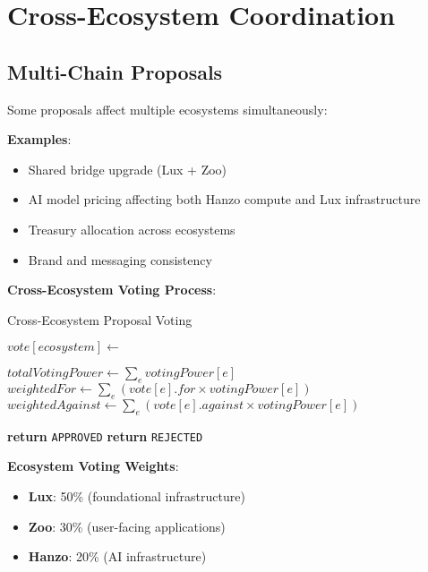 \documentclass[11pt,a4paper]{article}
\begin{document}
\section{Cross-Ecosystem Coordination}

\subsection{Multi-Chain Proposals}

Some proposals affect multiple ecosystems simultaneously:

\textbf{Examples}:
\begin{itemize}
\item Shared bridge upgrade (Lux + Zoo)
\item AI model pricing affecting both Hanzo compute and Lux infrastructure
\item Treasury allocation across ecosystems
\item Brand and messaging consistency
\end{itemize}

\textbf{Cross-Ecosystem Voting Process}:

\begin{algorithm}[H]
\caption{Cross-Ecosystem Proposal Voting}
\begin{algorithmic}[1]
        \State $vote[ecosystem] \gets$ 
    \EndFor

    \State $totalVotingPower \gets \sum_{e} votingPower[e]$
    \State $weightedFor \gets \sum_{e} (vote[e].for \times votingPower[e])$
    \State $weightedAgainst \gets \sum_{e} (vote[e].against \times votingPower[e])$

        \State \textbf{return} \texttt{APPROVED}
    \Else
        \State \textbf{return} \texttt{REJECTED}
    \EndIf
\EndFunction
\end{algorithmic}
\end{algorithm}

\textbf{Ecosystem Voting Weights}:
\begin{itemize}
\item \textbf{Lux}: 50\% (foundational infrastructure)
\item \textbf{Zoo}: 30\% (user-facing applications)
\item \textbf{Hanzo}: 20\% (AI infrastructure)
\end{itemize}
\end{document}
